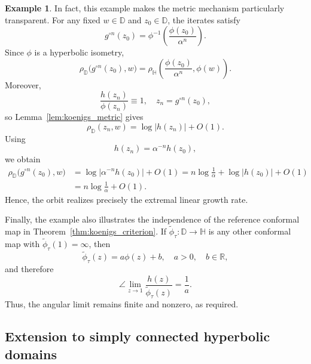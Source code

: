 \documentclass[12pt]{amsart}
\numberwithin{equation}{section}
\theoremstyle{plain}
\theoremstyle{definition}
\newtheorem{example}[equation]{Example}
\begin{document}
\begin{example}
In fact, this example makes the metric mechanism particularly
transparent. For any fixed $w\in\mathbb{D}$ and $z_0\in\mathbb{D}$,
the iterates satisfy
\begin{equation*}
g^{\circ n}(z_0)
=
\phi^{-1}\!\left(\frac{\phi(z_0)}{\alpha^n}\right).
\end{equation*}
Since $\phi$ is a hyperbolic isometry,
\begin{equation*}
\rho_{\mathbb{D}}
\bigl(g^{\circ n}(z_0),w\bigr)
=
\rho_{\mathbb{H}}
\left(
\frac{\phi(z_0)}{\alpha^n},
\phi(w)
\right).
\end{equation*}
Moreover,
\begin{equation*}
\frac{h(z_n)}{\phi(z_n)}\equiv1,
\quad
z_n=g^{\circ n}(z_0),
\end{equation*}
so Lemma~\ref{lem:koenigs_metric} gives
\begin{equation*}
\rho_{\mathbb{D}}(z_n,w)
=
\log|h(z_n)|+O(1).
\end{equation*}
Using
\begin{equation*}
h(z_n)=\alpha^{-n}h(z_0),
\end{equation*}
we obtain
\begin{align*}
\rho_{\mathbb{D}}
\bigl(g^{\circ n}(z_0),w\bigr)
&=
\log\left|\alpha^{-n}h(z_0)\right|+O(1)
=
n\log\frac1\alpha+\log|h(z_0)|+O(1)\\
&=
n\log\frac1\alpha+O(1).
\end{align*}
Hence, the orbit realizes precisely the extremal linear growth rate.

Finally, the example also illustrates the independence of the
reference conformal map in Theorem~\ref{thm:koenigs_criterion}. If
$\widetilde{\phi}_\tau:\mathbb{D}\to\mathbb{H}$ is any other conformal
map with $\widetilde{\phi}_\tau(1)=\infty$, then
\begin{equation*}
\widetilde{\phi}_\tau(z)=a\phi(z)+b,
\quad a>0,\quad b\in\mathbb{R},
\end{equation*}
and therefore
\begin{equation*}
\angle\lim_{z\to1}
\frac{h(z)}{\widetilde{\phi}_\tau(z)}
=
\frac1a.
\end{equation*}
Thus, the angular limit remains finite and nonzero, as required.
\end{example}


\subsection{Extension to simply connected hyperbolic domains}
\label{subsec:simply_connected}
\end{document}
